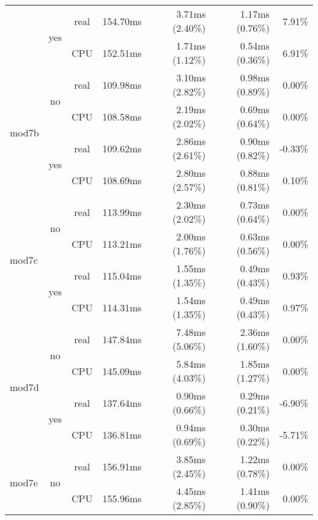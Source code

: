 \documentclass[en]{pracamgr}
\begin{document}
\begin{appendices}
\begin{small}
\begin{longtable}{|l|c|c|r|r|r|r|}
                          \cline{2-7}
                          & \multirow{2}{*}{yes} & real & 154.70ms & 3.71ms (2.40\%) & 1.17ms (0.76\%) & 7.91\% \\*
                          &                      & CPU  & 152.51ms & 1.71ms (1.12\%) & 0.54ms (0.36\%) & 6.91\% \\
\hline
\multirow{4}{*}{mod7b}    & \multirow{2}{*}{no}  & real & 109.98ms & 3.10ms (2.82\%) & 0.98ms (0.89\%) & 0.00\% \\*
                          &                      & CPU  & 108.58ms & 2.19ms (2.02\%) & 0.69ms (0.64\%) & 0.00\% \\*
                          \cline{2-7}
                          & \multirow{2}{*}{yes} & real & 109.62ms & 2.86ms (2.61\%) & 0.90ms (0.82\%) & -0.33\% \\*
                          &                      & CPU  & 108.69ms & 2.80ms (2.57\%) & 0.88ms (0.81\%) & 0.10\% \\
\hline
\multirow{4}{*}{mod7c}    & \multirow{2}{*}{no}  & real & 113.99ms & 2.30ms (2.02\%) & 0.73ms (0.64\%) & 0.00\% \\*
                          &                      & CPU  & 113.21ms & 2.00ms (1.76\%) & 0.63ms (0.56\%) & 0.00\% \\*
                          \cline{2-7}
                          & \multirow{2}{*}{yes} & real & 115.04ms & 1.55ms (1.35\%) & 0.49ms (0.43\%) & 0.93\% \\*
                          &                      & CPU  & 114.31ms & 1.54ms (1.35\%) & 0.49ms (0.43\%) & 0.97\% \\
\hline
\multirow{4}{*}{mod7d}    & \multirow{2}{*}{no}  & real & 147.84ms & 7.48ms (5.06\%) & 2.36ms (1.60\%) & 0.00\% \\*
                          &                      & CPU  & 145.09ms & 5.84ms (4.03\%) & 1.85ms (1.27\%) & 0.00\% \\*
                          \cline{2-7}
                          & \multirow{2}{*}{yes} & real & 137.64ms & 0.90ms (0.66\%) & 0.29ms (0.21\%) & -6.90\% \\*
                          &                      & CPU  & 136.81ms & 0.94ms (0.69\%) & 0.30ms (0.22\%) & -5.71\% \\
\hline
\multirow{4}{*}{mod7e}    & \multirow{2}{*}{no}  & real & 156.91ms & 3.85ms (2.45\%) & 1.22ms (0.78\%) & 0.00\% \\*
                          &                      & CPU  & 155.96ms & 4.45ms (2.85\%) & 1.41ms (0.90\%) & 0.00\% \\*

\end{longtable}
\end{small}
\end{appendices}
\end{document}

